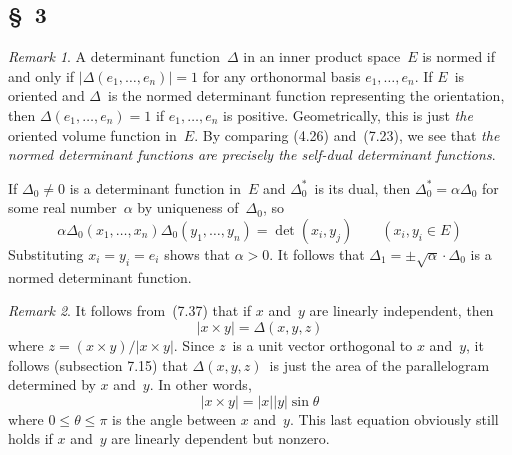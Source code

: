 \documentclass[letterpaper,12pt]{article}
\newcommand{\mult}{\cdot}
\newcommand{\cross}{\times}
\newcommand{\iprod}[2]{(#1,#2)}
\newcommand{\norm}[1]{|#1|}
\newcommand{\abs}[1]{|#1|}
\theoremstyle{definition}
\theoremstyle{remark}
\newtheorem*{rmk}{Remark}
\begin{document}
\subsection*{\S~3}
\begin{rmk}
A determinant function~\(\Delta\) in an inner product space~\(E\) is normed if and only if \(\abs{\Delta(e_1,\ldots,e_n)}=1\) for any orthonormal basis \(e_1,\ldots,e_n\). If \(E\)~is oriented and \(\Delta\)~is the normed determinant function representing the orientation, then \(\Delta(e_1,\ldots,e_n)=1\) if \(e_1,\ldots,e_n\) is positive. Geometrically, this is just \emph{the} oriented volume function in~\(E\). By comparing (4.26) and~(7.23), we see that \emph{the normed determinant functions are precisely the self-dual determinant functions}.

If \(\Delta_0\ne 0\) is a determinant function in~\(E\) and \(\Delta_0^*\)~is its dual, then \(\Delta_0^*=\alpha\Delta_0\) for some real number~\(\alpha\) by uniqueness of~\(\Delta_0\), so
\[\alpha\Delta_0(x_1,\ldots,x_n)\Delta_0(y_1,\ldots,y_n)=\det\iprod{x_i}{y_j}\qquad(x_i,y_i\in E)\]
Substituting \(x_i=y_i=e_i\) shows that \(\alpha>0\). It follows that \(\Delta_1=\pm\sqrt{\alpha}\mult\Delta_0\) is a normed determinant function.
\end{rmk}

\begin{rmk}
It follows from~(7.37) that if \(x\) and~\(y\) are linearly independent, then
\[\norm{x\cross y}=\Delta(x,y,z)\]
where \(z=(x\cross y)/\norm{x\cross y}\). Since \(z\)~is a unit vector orthogonal to \(x\) and~\(y\), it follows (subsection 7.15) that \(\Delta(x,y,z)\)~is just the area of the parallelogram determined by \(x\) and~\(y\). In other words,
\[\norm{x\cross y}=\norm{x}\norm{y}\sin\theta\]
where \(0\le\theta\le\pi\) is the angle between \(x\) and~\(y\). This last equation obviously still holds if \(x\) and~\(y\) are linearly dependent but nonzero.
\end{rmk}
\end{document}
